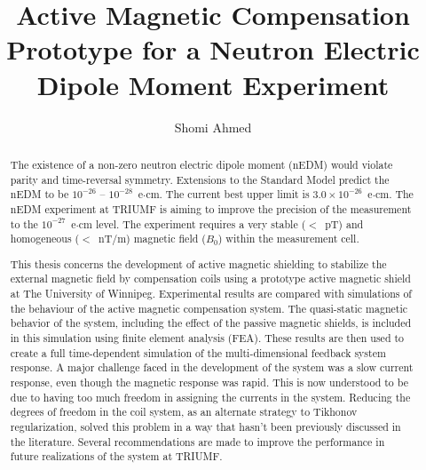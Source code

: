 \title{Active Magnetic Compensation Prototype for a Neutron Electric Dipole Moment Experiment}
\author{Shomi Ahmed}

%
%
%





\maketitle


\begin{abstract}
The existence of a non-zero neutron electric dipole moment (nEDM) would violate parity and time-reversal symmetry.  Extensions to the Standard Model predict the nEDM to be $10^{-26}$ -- $10^{-28}$~e$\cdot$cm.  The current best upper limit is $3.0 \times 10^{-26}$~e$\cdot$cm.  The nEDM experiment at TRIUMF is aiming to improve the precision of the measurement to the $10^{-27}$~e$\cdot$cm level.  The experiment requires a very stable ($<$~pT) and homogeneous ($<$~nT/m) magnetic field ($B_0$) within the measurement cell.  

This thesis concerns the development of active magnetic shielding to stabilize the external magnetic field by compensation coils using a prototype active magnetic shield at The University of Winnipeg.  Experimental results are compared with simulations of the behaviour of the active magnetic compensation system.  The quasi-static magnetic behavior of the system, including the effect of the passive magnetic shields, is included in this simulation using finite element analysis (FEA).  These results are then used to create a full time-dependent simulation of the multi-dimensional feedback system response.  A major challenge faced in the development of the system was a slow current response, even though the magnetic response was rapid.  This is now understood to be due to having too much freedom in assigning the currents in the system.  Reducing the degrees of freedom in the coil system, as an alternate strategy to Tikhonov regularization, solved this problem in a way that hasn't been previously discussed in the literature.  Several recommendations are made to improve the performance in future realizations of the system at TRIUMF.





\end{abstract}

